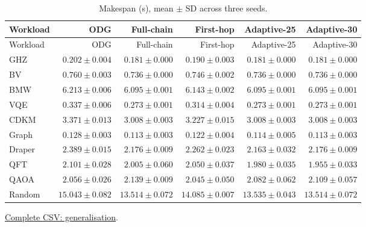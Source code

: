 \begin{center}\small
\begin{longtable}{lrrrrr}
\caption{Makespan (s), mean $\pm$ SD across three seeds.}\\
\toprule
Workload & ODG & Full-chain & First-hop & Adaptive-25 & Adaptive-30 \\
\midrule\endfirsthead
\toprule
Workload & ODG & Full-chain & First-hop & Adaptive-25 & Adaptive-30 \\
\midrule\endhead
GHZ & $0.202 \pm 0.004$ & $0.181 \pm 0.000$ & $0.190 \pm 0.003$ & $0.181 \pm 0.000$ & $0.181 \pm 0.000$ \\
BV & $0.760 \pm 0.003$ & $0.736 \pm 0.000$ & $0.746 \pm 0.002$ & $0.736 \pm 0.000$ & $0.736 \pm 0.000$ \\
BMW & $6.213 \pm 0.006$ & $6.095 \pm 0.001$ & $6.143 \pm 0.002$ & $6.095 \pm 0.001$ & $6.095 \pm 0.001$ \\
VQE & $0.337 \pm 0.006$ & $0.273 \pm 0.001$ & $0.314 \pm 0.004$ & $0.273 \pm 0.001$ & $0.273 \pm 0.001$ \\
CDKM & $3.371 \pm 0.013$ & $3.008 \pm 0.003$ & $3.227 \pm 0.015$ & $3.008 \pm 0.003$ & $3.008 \pm 0.003$ \\
Graph & $0.128 \pm 0.003$ & $0.113 \pm 0.003$ & $0.122 \pm 0.004$ & $0.114 \pm 0.005$ & $0.113 \pm 0.003$ \\
Draper & $2.389 \pm 0.015$ & $2.176 \pm 0.009$ & $2.262 \pm 0.023$ & $2.163 \pm 0.032$ & $2.176 \pm 0.009$ \\
QFT & $2.101 \pm 0.028$ & $2.005 \pm 0.060$ & $2.050 \pm 0.037$ & $1.980 \pm 0.035$ & $1.955 \pm 0.033$ \\
QAOA & $2.056 \pm 0.026$ & $2.139 \pm 0.009$ & $2.045 \pm 0.050$ & $2.082 \pm 0.062$ & $2.109 \pm 0.057$ \\
Random & $15.043 \pm 0.082$ & $13.514 \pm 0.072$ & $14.085 \pm 0.007$ & $13.535 \pm 0.043$ & $13.514 \pm 0.072$ \\
\bottomrule\end{longtable}\end{center}
{\footnotesize \href{https://github.com/sanjeevkrishnaa/Compiler-Driven-ACE/blob/codex/ace-scheduler-correctness/docs/latex/oct25_pre_golden/data/generalisation.csv}{Complete CSV: generalisation}. }

